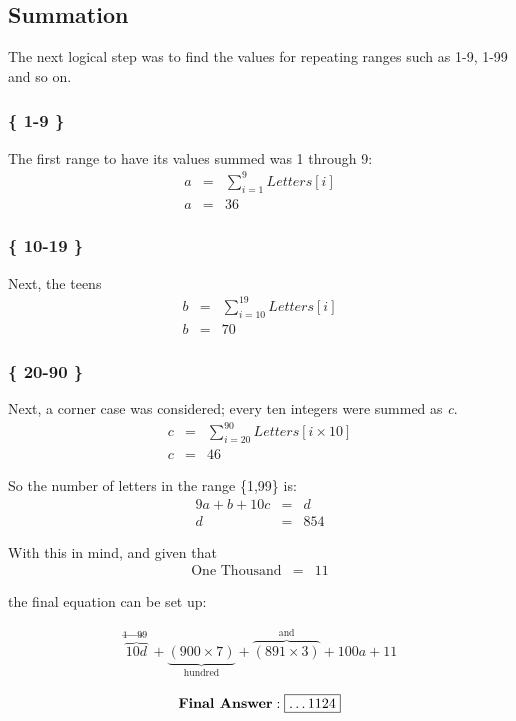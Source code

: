 \documentclass{article}
\begin{document}
\subsection{Summation}
The next logical step was to find the values for repeating ranges such as 1-9,
1-99 and so on. 

\subsubsection{\{ 1-9 \}}
The first range to have its values summed was 1 through 9:
\begin{eqnarray*}
  a &=& \sum_{i=1}^{9} Letters[i]\\
  a &=& \boxed{36}
  \label{1thru9}
\end{eqnarray*}

\subsubsection{ \{ 10-19 \} }
Next, the teens
\begin{eqnarray*}
  b &=& \sum_{i=10}^{19} Letters[i]\\
  b &=& \boxed{70}
  \label{10thru19}
\end{eqnarray*}

\subsubsection{\{ 20-90 \}}
Next, a corner case was considered; every ten integers were summed as \emph{c}.
\begin{eqnarray*}
  c &=& \sum_{i=20}^{90} Letters[i\times10]\\
  c &=& \boxed{46}
  \label{20thru90}
\end{eqnarray*}

So the number of letters in the range \{1,99\} is:
\begin{eqnarray*}
  9a+b+10c &=& d\\ 
  d &=&\boxed{854} 
  \label{1thru99sum}
\end{eqnarray*}

With this in mind, and given that 
\begin{eqnarray*}
  \text{One Thousand} &=& \boxed{11}
\end{eqnarray*}

the final equation can be set up:

\begin{eqnarray*}
  \overbrace{10d}^{\text{1$\to$99 }} +
  \underbrace{(900 \times 7)}_{\text{hundred}} +
  \overbrace{(891\times3)}^{\text{and}}+
  100a+11\\
\end{eqnarray*}                   
\begin{eqnarray*}
  \text{\bf{Final Answer}}: \boxed{\ldots 1124}
\end{eqnarray*}                   
\end{document}

